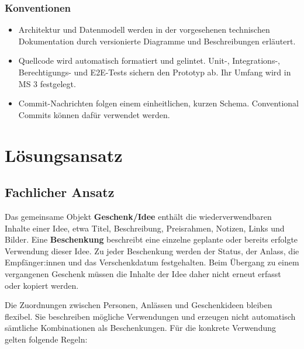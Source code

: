 \documentclass[11pt,a4paper]{article}
\begin{document}
\subsubsection{Konventionen}

\begin{itemize}
\item Architektur und Datenmodell werden in der vorgesehenen technischen Dokumentation durch versionierte Diagramme und Beschreibungen erläutert.
\item Quellcode wird automatisch formatiert und gelintet. Unit-, Integrations-, Berechtigungs- und E2E-Tests sichern den Prototyp ab. Ihr Umfang wird in MS 3 festgelegt.
\item Commit-Nachrichten folgen einem einheitlichen, kurzen Schema. Conventional Commits können dafür verwendet werden.
\end{itemize}

\section{Lösungsansatz}

\subsection{Fachlicher Ansatz}

Das gemeinsame Objekt \textbf{Geschenk/Idee} enthält die wiederverwendbaren Inhalte einer Idee, etwa Titel, Beschreibung, Preisrahmen, Notizen, Links und Bilder. Eine \textbf{Beschenkung} beschreibt eine einzelne geplante oder bereits erfolgte Verwendung dieser Idee. Zu jeder Beschenkung werden der Status, der Anlass, die Empfänger:innen und das Verschenkdatum festgehalten. Beim Übergang zu einem vergangenen Geschenk müssen die Inhalte der Idee daher nicht erneut erfasst oder kopiert werden.

Die Zuordnungen zwischen Personen, Anlässen und Geschenkideen bleiben flexibel. Sie beschreiben mögliche Verwendungen und erzeugen nicht automatisch sämtliche Kombinationen als Beschenkungen. Für die konkrete Verwendung gelten folgende Regeln:
\end{document}
